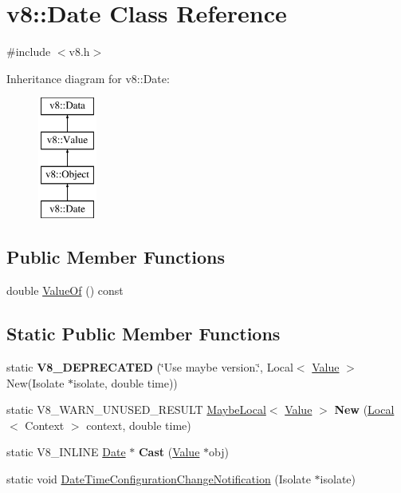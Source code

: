 \hypertarget{classv8_1_1Date}{}\section{v8\+:\+:Date Class Reference}
\label{classv8_1_1Date}


{\ttfamily \#include $<$v8.\+h$>$}

Inheritance diagram for v8\+:\+:Date\+:\begin{figure}[H]
\begin{center}
\leavevmode
\includegraphics[height=4.000000cm]{classv8_1_1Date}
\end{center}
\end{figure}
\subsection*{Public Member Functions}
\begin{DoxyCompactItemize}
\item 
double \mbox{\hyperlink{classv8_1_1Date_adb9d292549a173e045ee177051dbde19}{Value\+Of}} () const
\end{DoxyCompactItemize}
\subsection*{Static Public Member Functions}
\begin{DoxyCompactItemize}
\item 
\mbox{\label{classv8_1_1Date_abd1ff8294e0d5a513696b72b67d36ecf}} 
static {\bfseries V8\+\_\+\+D\+E\+P\+R\+E\+C\+A\+T\+ED} (\char`\"{}Use maybe version.\char`\"{}, Local$<$ \mbox{\hyperlink{classv8_1_1Value}{Value}} $>$ New(Isolate $\ast$isolate, double time))
\item 
\mbox{\label{classv8_1_1Date_a24b0f95c7b9ec5133ad5a983a0a07ce4}} 
static V8\+\_\+\+W\+A\+R\+N\+\_\+\+U\+N\+U\+S\+E\+D\+\_\+\+R\+E\+S\+U\+LT \mbox{\hyperlink{classv8_1_1MaybeLocal}{Maybe\+Local}}$<$ \mbox{\hyperlink{classv8_1_1Value}{Value}} $>$ {\bfseries New} (\mbox{\hyperlink{classv8_1_1Local}{Local}}$<$ Context $>$ context, double time)
\item 
\mbox{\label{classv8_1_1Date_aebb004782ef43f01518f24e662ef6ad8}} 
static V8\+\_\+\+I\+N\+L\+I\+NE \mbox{\hyperlink{classv8_1_1Date}{Date}} $\ast$ {\bfseries Cast} (\mbox{\hyperlink{classv8_1_1Value}{Value}} $\ast$obj)
\item 
static void \mbox{\hyperlink{classv8_1_1Date_afa8f4fb31292d1914d9a89fab4fa4415}{Date\+Time\+Configuration\+Change\+Notification}} (Isolate $\ast$isolate)
\end{DoxyCompactItemize}


